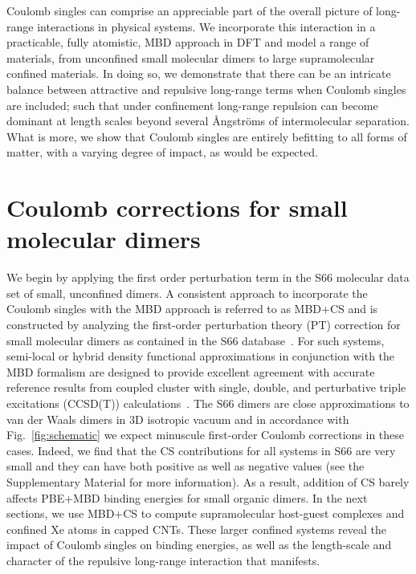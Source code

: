 \documentclass[aps,prl,groupaddress, twocolumn]{revtex4-1}  %
\begin{document}
Coulomb singles can comprise an appreciable part of the overall picture of long-range interactions in physical systems. We incorporate this interaction in a practicable, fully atomistic, MBD approach in DFT and model a range of materials, from unconfined small molecular dimers to large supramolecular confined materials. In doing so, we demonstrate that there can be an intricate balance between attractive and repulsive long-range terms when Coulomb singles are included; such that under confinement long-range repulsion can become dominant at length scales beyond several \r{A}ngstr\"{o}ms of intermolecular separation. What is more, we show that Coulomb singles are entirely befitting to all forms of matter, with a varying degree of impact, as would be expected.

\section*{Coulomb corrections for small molecular dimers}
We begin by applying the first order perturbation term in the S66 molecular data set of small, unconfined dimers. A consistent approach to incorporate the Coulomb singles with the MBD approach is referred to as MBD+CS and is constructed by analyzing the first-order perturbation theory (PT) correction for small molecular dimers as contained in the S66 database~\cite{s66X8_database}.
For such systems, semi-local or hybrid density functional approximations in conjunction with the MBD formalism are designed to provide excellent agreement with accurate reference results from coupled cluster with single, double, and perturbative triple excitations (CCSD(T)) calculations~\cite{Tkatchenko2012}.  %
The S66 dimers are close approximations to van der Waals dimers in 3D isotropic vacuum and in accordance with Fig.~\ref{fig:schematic} we expect minuscule first-order Coulomb corrections in these cases.
Indeed, we find that the CS contributions for all systems in S66 are very small and they can have both positive as well as negative values (see the Supplementary Material for more information). As a result, addition of CS barely affects PBE+MBD binding energies for small organic dimers.
In the next sections, we use MBD+CS to compute supramolecular host-guest complexes and confined Xe atoms in capped CNTs. These larger confined systems reveal the impact of Coulomb singles on binding energies, as well as the length-scale and character of the repulsive long-range interaction that manifests.
\end{document}
